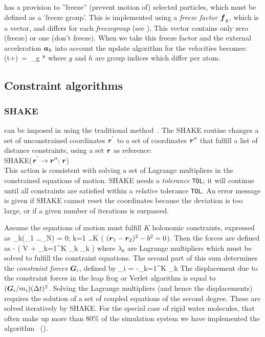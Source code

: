 {\gromacs} has a provision to ''freeze''  (prevent motion of) selected
particles, which must be defined as a 'freeze group'. This is implemented
using a {\em freeze factor $\mbox{\boldmath ${f}$}_g$}, which is a vector, and differs for each
{\em freezegroup} (see ). This vector contains only
zero (freeze) or one (don't freeze).
When we take this freeze factor and the external acceleration $\mbox{\boldmath ${a}$}_h$ into 
account the update algorithm for the velocities becomes:
\beq
{}(t+\hdt)~=~_g * \lambda * 
\eeq
where $g$ and $h$ are group indices which differ per atom.

\subsection{Constraint algorithms}

\subsubsection*{SHAKE}
 can be imposed in {\gromacs} using the traditional 
method~\cite{Ryckaert77}. The SHAKE routine changes a set of unconstrained
coordinates $\mbox{\boldmath ${r}$}^{'}$ to a set of coordinates $\mbox{\boldmath ${r}$}''$ that
fulfill a  list of distance constraints, using a set $\mbox{\boldmath ${r}$}$ as
reference: \\[1ex] 
\hspace*{5em} SHAKE($\mbox{\boldmath ${r}$}^{'} \rightarrow  \mbox{\boldmath ${r}$}'';\,  \mbox{\boldmath ${r}$}$) \\[1ex]
This action is consistent with solving a set of Lagrange multipliers
in the constrained equations of motion. SHAKE needs a {\em tolerance}
\verb'TOL'; it will continue until all constraints are satisfied
within a {\em relative} tolerance \verb'TOL'. An error message is
given if SHAKE cannot reset the coordinates because the deviation is
too large, or if a given number of iterations is surpassed. 

Assume the equations of motion must fulfill $K$ holonomic constraints,
expressed as
\beq
\sigma_k(_1 \ldots {}_N) = 0; \;\; k=1 \ldots K
\eeq
({\eg} $(\mbox{\boldmath ${r}$}_1 - \mbox{\boldmath ${r}$}_2)^2 - b^2 = 0$). 
Then the forces are defined as 
\beq
-  \left( V + \sum_{k=1}^K \lambda_k
\sigma_k \right)
\eeq
where $\lambda_k$ are Lagrange multipliers which must be solved to
fulfill the constraint equations. The second part of this sum
determines the {\em constraint forces} $\mbox{\boldmath ${G}$}_i$, defined by
\beq
{}_i = -\sum_{k=1}^K \lambda_k 
\eeq
The displacement due to the constraint forces in the leap frog or
Verlet algorithm is equal to $(\mbox{\boldmath ${G}$}_i/m_i)({\Delta t})^2$. Solving the
Lagrange multipliers (and hence the displacements) requires the
solution of a set of coupled equations of the second degree. These are
solved iteratively by SHAKE.
For the special case of rigid water molecules, that often make up more
than 80\% of the simulation system we have implemented the 
algorithm~\cite{Miyamoto92} ().


